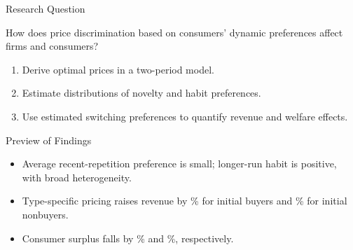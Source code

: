 \documentclass[aspectratio=169,professionalfonts]{beamer}
\newcommand{\shortbuttons}{}
\begin{document}
\begin{frame}[label=short-2]{Research Question} 
  \begin{tcolorbox}
    How does price discrimination based on consumers' dynamic preferences affect firms and consumers?
  \end{tcolorbox}
  \begin{enumerate}
    \item Derive optimal prices in a two-period model.
    \item Estimate distributions of novelty and habit preferences.
    \item Use estimated switching preferences to quantify revenue and welfare effects.
  \end{enumerate}
\end{frame}

\begin{frame}{Preview of Findings}
  \begin{itemize}
    \item Average recent-repetition preference is small; longer-run habit is positive, with broad heterogeneity.
    \item Type-specific pricing raises revenue by \correctedInsideRevenueChange\% for initial buyers and \correctedOutsideRevenueChange\% for initial nonbuyers.
    \item Consumer surplus falls by \correctedInsideCSChange\% and \correctedOutsideCSChange\%, respectively.
  \end{itemize}
\end{frame}
\gdef\shortbuttons{}
\end{document}
